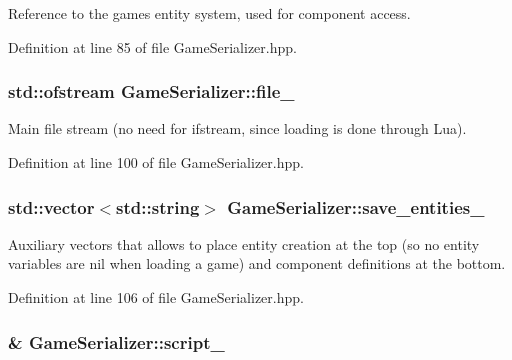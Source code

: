 Reference to the game\textquotesingle{}s entity system, used for component access. 



Definition at line 85 of file Game\+Serializer.\+hpp.

\subsubsection[{\texorpdfstring{file\+\_\+}{file_}}]{\setlength{\rightskip}{0pt plus 5cm}std\+::ofstream Game\+Serializer\+::file\+\_\+\hspace{0.3cm}{\ttfamily [private]}}\hypertarget{class_game_serializer_a85c282b5993050dba19dc760ea33b536}{}\label{class_game_serializer_a85c282b5993050dba19dc760ea33b536}


Main file stream (no need for ifstream, since loading is done through Lua). 



Definition at line 100 of file Game\+Serializer.\+hpp.

\subsubsection[{\texorpdfstring{save\+\_\+entities\+\_\+}{save_entities_}}]{\setlength{\rightskip}{0pt plus 5cm}std\+::vector$<$std\+::string$>$ Game\+Serializer\+::save\+\_\+entities\+\_\+\hspace{0.3cm}{\ttfamily [private]}}\hypertarget{class_game_serializer_a0f6b379c053d77bb9df6bc8004280ccd}{}\label{class_game_serializer_a0f6b379c053d77bb9df6bc8004280ccd}


Auxiliary vectors that allows to place entity creation at the top (so no entity variables are nil when loading a game) and component definitions at the bottom. 



Definition at line 106 of file Game\+Serializer.\+hpp.

\subsubsection[{\texorpdfstring{script\+\_\+}{script_}}]{\& Game\+Serializer\+::script\+\_\+\hspace{0.3cm}{\ttfamily [private]}}\hypertarget{class_game_serializer_a96a50f04014f8378c8cb30321107ef25}{}\label{class_game_serializer_a96a50f04014f8378c8cb30321107ef25}


